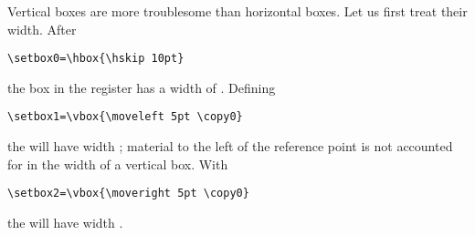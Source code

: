 \documentclass{book}
\begin{document}
Vertical boxes are more troublesome than horizontal boxes.
Let us first treat their width.
After
\begin{verbatim}
\setbox0=\hbox{\hskip 10pt}
\end{verbatim}
the box in the
 register has a width of \n{10pt}. Defining
\begin{verbatim}
\setbox1=\vbox{\moveleft 5pt \copy0}
\end{verbatim}
the  will have width \n{5pt}; material to the
left of the reference point is not accounted for in the
width of a vertical box. With
\begin{verbatim}
\setbox2=\vbox{\moveright 5pt \copy0}
\end{verbatim}
the  will have width \n{15pt}.
\end{document}
